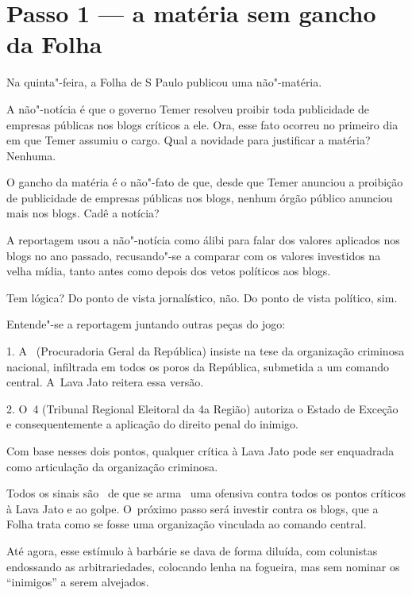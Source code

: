  

\section{Passo 1 --- a matéria sem gancho da Folha}

Na quinta"-feira, a Folha de S Paulo publicou uma não"-matéria.

A não"-notícia é que o governo Temer resolveu proibir toda publicidade de
empresas públicas nos blogs críticos a ele. Ora, esse fato ocorreu no
primeiro dia em que Temer assumiu o cargo. Qual a novidade para
justificar a matéria? Nenhuma.

O gancho da matéria é o não"-fato de que, desde que Temer anunciou a
proibição de publicidade de empresas públicas nos blogs, nenhum órgão
público anunciou mais nos blogs. Cadê a notícia?

A reportagem usou a não"-notícia como álibi para falar dos valores
aplicados nos blogs no ano passado, recusando"-se a comparar com os
valores investidos na velha mídia, tanto antes como depois dos vetos
políticos aos blogs.

Tem lógica? Do ponto de vista jornalístico, não. Do ponto de vista
político, sim.

Entende"-se a reportagem juntando outras peças do jogo:

1. A~ (Procuradoria Geral da República) insiste na tese da
organização criminosa nacional, infiltrada em todos os poros da
República, submetida a um comando central. A~Lava Jato reitera essa
versão.

2. O~4 (Tribunal Regional Eleitoral da 4a Região) autoriza o Estado
de Exceção e consequentemente a aplicação do direito penal do inimigo.

Com base nesses dois pontos, qualquer crítica à Lava Jato pode ser
enquadrada como articulação da organização criminosa.

Todos os sinais são ~de que se arma ~uma ofensiva contra todos os pontos
críticos à Lava Jato e ao golpe. O~próximo passo será investir contra os
blogs, que a Folha trata como se fosse uma organização vinculada ao
comando central.

Até agora, esse estímulo à barbárie se dava de forma diluída, com
colunistas endossando as arbitrariedades, colocando lenha na fogueira,
mas sem nominar os ``inimigos'' a serem alvejados.

